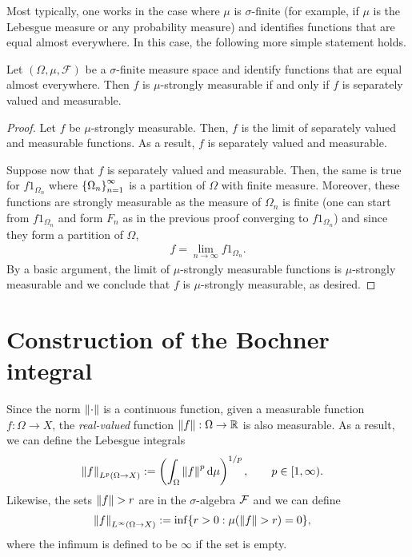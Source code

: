 \documentclass[
    a4paper,
    DIV=14,
    abstract=true,
    numbers=noenddot
]{scrartcl}
\begin{document}
Most typically, one works in the case where $\mu $ is $\sigma $-finite (for example, if $\mu $ is the Lebesgue measure or any probability measure) and identifies functions that are equal almost everywhere. In this case, the following more simple statement holds.
\begin{theorem}\label{thm:pettis2}
	Let $(\Omega, \mu, \mathcal{F})$ be a $\sigma $-finite measure space and identify functions that are equal almost everywhere. Then $f$ is $\mu $-strongly measurable if and only if $f$ is separately valued and measurable.
\end{theorem}
\begin{proof}
	Let $f$ be $\mu $-strongly measurable. Then, $f$ is the limit of separately valued and measurable functions. As a result, $f$ is separately valued and measurable.

	Suppose now that $f$ is separately valued and measurable. Then, the same is true for $f 1_{\Omega_n}$ where $\left\{\Omega_n\right\}_{n=1}^\infty$ is a partition of $\Omega$ with finite measure. Moreover, these functions are strongly measurable as the measure of $\Omega _n$ is finite (one can start from $f 1_{\Omega_n}$ and form $F_n$ as in the previous proof converging to $f 1_{\Omega _n}$) and since they form a partition of $\Omega$,
	\begin{align*}
		f=\lim_{n \to \infty} f 1_{\Omega_n}.
	\end{align*}
	By a basic argument, the limit of $\mu $-strongly measurable functions is $\mu $-strongly measurable and
	we conclude that $f$ is $\mu $-strongly measurable, as desired.



\end{proof}

\section{Construction of the Bochner integral}
Since the norm $\left\lVert \cdot  \right\rVert$ is a continuous function, given a measurable function $f: \Omega \to X$, the \emph{real-valued} function $\left\lVert f \right\rVert: \Omega \to \mathbb{R}$ is also measurable. As a result, we can define the Lebesgue integrals
\begin{align}\label{Lp}
	\left\lVert f \right\rVert_{L^p(\Omega\to X)} & :=\left(\int_\Omega \left\lVert f \right\rVert^p \mathrm{d}\mu\right)^{1/p},\quad \quad p \in [1,\infty).
\end{align}
Likewise, the sets $\left\lVert f \right\rVert>r$ are in the $\sigma $-algebra $\mathcal{F} $ and we can define
\begin{align}\label{Linfty}
	\left\lVert f \right\rVert_{L^\infty(\Omega\to X)} & :=\inf\{r>0: \mu ( \left\lVert f \right\rVert> r)=0\},
\end{align}
where the infimum is defined to be $\infty$ if the set is empty.
\end{document}
